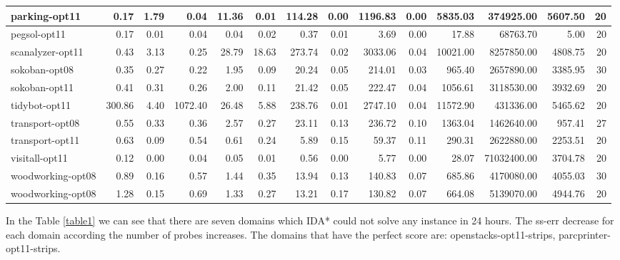 \documentclass[a4paper,12pt]{article}
\begin{document}
\begin{table}[]
\begin{tabular}{l@{\hspace{6pt}} *{13}{|r}}
parking-opt11           & 0.17 & 1.79 & 0.04 & 11.36 & 0.01 & 114.28 & 0.00 & 1196.83 & 0.00 & 5835.03 & 374925.00 & 5607.50 & 20 \\ \hline
pegsol-opt11            & 0.17 & 0.01 & 0.04 & 0.04 & 0.02 & 0.37 & 0.01 & 3.69 & 0.00 & 17.88 & 68763.70 & 5.00 & 20 \\ \hline
scanalyzer-opt11        & 0.43 & 3.13 & 0.25 & 28.79 & 18.63 & 273.74 & 0.02 & 3033.06 & 0.04 & 10021.00 & 8257850.00 & 4808.75 & 20 \\ \hline
sokoban-opt08           & 0.35 & 0.27 & 0.22 & 1.95 & 0.09 & 20.24 & 0.05 & 214.01 & 0.03 & 965.40 & 2657890.00 & 3385.95 & 30 \\ \hline
sokoban-opt11           & 0.41 & 0.31 & 0.26 & 2.00 & 0.11 & 21.42 & 0.05 & 222.47 & 0.04 & 1056.61 & 3118530.00 & 3932.69 & 20 \\ \hline
tidybot-opt11           & 300.86 & 4.40 & 1072.40 & 26.48 & 5.88 & 238.76 & 0.01 & 2747.10 & 0.04 & 11572.90 & 431336.00 & 5465.62 & 20 \\ \hline
transport-opt08         & 0.55 & 0.33 & 0.36 & 2.57 & 0.27 & 23.11 & 0.13 & 236.72 & 0.10 & 1363.04 & 1462640.00 & 957.41 & 27 \\ \hline
transport-opt11         & 0.63 & 0.09 & 0.54 & 0.61 & 0.24 & 5.89 & 0.15 & 59.37 & 0.11 & 290.31 & 2622880.00 & 2253.51 & 20 \\ \hline
visitall-opt11          & 0.12 & 0.00 & 0.04 & 0.05 & 0.01 & 0.56 & 0.00 & 5.77 & 0.00 & 28.07 & 71032400.00 & 3704.78 & 20 \\ \hline
woodworking-opt08       & 0.89 & 0.16 & 0.57 & 1.44 & 0.35 & 13.94 & 0.13 & 140.83 & 0.07 & 685.86 & 4170080.00 & 4055.03 & 30 \\ \hline
woodworking-opt08       & 1.28 & 0.15 & 0.69 & 1.33 & 0.27 & 13.21 & 0.17 & 130.82 & 0.07 & 664.08 & 5139070.00 & 4944.76 & 20 \\ \hline
\end{tabular}
\end{table}


In the Table \ref{table1} we can see that there are seven domains which IDA* could not solve any instance in 24 hours. The ss-err decrease for each domain according the number of probes increases. The domains that have the perfect score are: openstacks-opt11-strips, parcprinter-opt11-strips. 

\newpage
\end{document}
